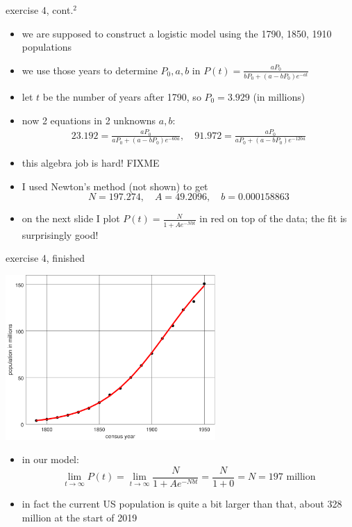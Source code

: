 \documentclass[colorlinks]{beamer}
\begin{document}
\begin{frame}{exercise 4, cont.$^2$}

\begin{itemize}
\item we are supposed to construct a logistic model using the 1790, 1850, 1910 populations
\item we use those years to determine $P_0,a,b$ in $P(t)=\frac{aP_0}{bP_0+(a-bP_0) e^{-at}}$
\item let $t$ be the number of years after 1790, so $P_0=3.929$ (in millions)
\item now 2 equations in 2 unknowns $a,b$:
\small
\begin{align*}
23.192 = \frac{aP_0}{aP_0 + (a-bP_0) e^{-60 a}}, \quad 91.972 = \frac{aP_0}{aP_0 + (a-bP_0) e^{-120 a}}
\end{align*}
\normalsize
\item this algebra job is hard! FIXME
\item I used Newton's method (not shown) to get
    $$N=197.274, \quad A=49.2096, \quad b=0.000158863$$
\item on the next slide I plot $P(t) = \frac{N}{1 + A e^{-Nbt}}$ in red on top of the data; the fit is surprisingly good!
\end{itemize}
\end{frame}


\begin{frame}{exercise 4, finished}

\begin{center}
\includegraphics[width=0.6\textwidth]{figs/fitcensus}
\end{center}

\vspace{-2mm}
\begin{itemize}
\item in our model:
    $$\lim_{t\to \infty} P(t) = \lim_{t\to \infty} \frac{N}{1 + A e^{-Nbt}} = \frac{N}{1+0} = N = 197 \text{ million}$$
\item in fact the current US population is quite a bit larger than that, about 328 million at the start of 2019
\end{itemize}
\end{frame}
\end{document}
